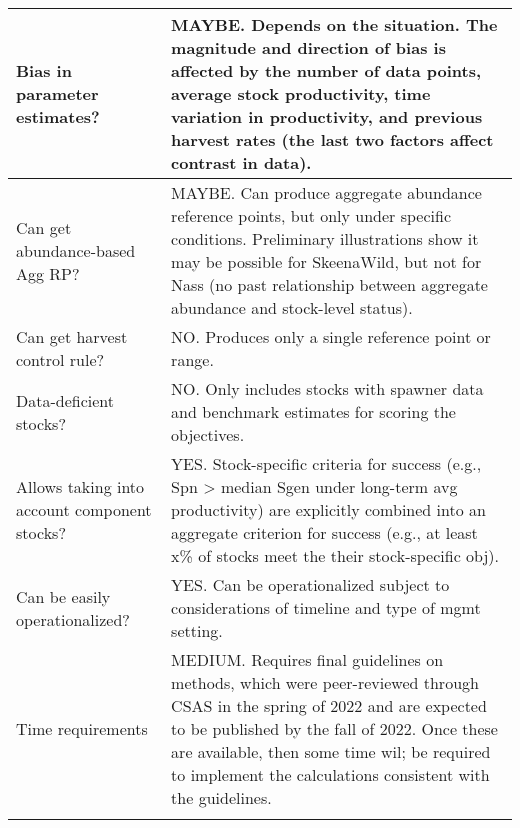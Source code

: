 \documentclass[french,11pt]{book}
\begin{document}
\begin{longtable}[t]{>{\raggedright\arraybackslash}p{9em}>{\raggedright\arraybackslash}p{37em}}
\midrule Bias in parameter estimates? & MAYBE.  Depends on the situation. The magnitude and direction of bias is affected by the number of data points, average stock productivity, time variation in productivity, and previous harvest rates (the last two factors affect contrast in data).\\
\midrule Can get abundance-based Agg RP? & MAYBE.  Can produce aggregate abundance reference points, but only under specific conditions. Preliminary illustrations show it may be possible for SkeenaWild, but not for Nass (no past relationship between aggregate abundance and stock-level status).\\
\midrule Can get harvest control rule? & NO.  Produces only a single reference point or range.\\
\midrule Data-deficient stocks? & NO. Only includes stocks with spawner data and benchmark estimates for scoring the objectives.\\
\midrule Allows taking into account component stocks? & YES.  Stock-specific criteria for success (e.g.,  Spn > median Sgen under long-term avg productivity) are explicitly combined into an aggregate criterion for success (e.g., at least x\% of stocks meet the their stock-specific obj).\\
\midrule Can be easily operationalized? & YES. Can be operationalized subject to considerations of timeline and type of mgmt setting.\\
\midrule Time requirements & MEDIUM. Requires final guidelines on methods, which were peer-reviewed through CSAS in the spring of 2022 and are expected to be published by the fall of 2022. Once these are available, then some time wil; be required to implement the calculations consistent with the guidelines.\\* \end{longtable}

\endgroup{} \endgroup{}

\clearpage
\end{document}

